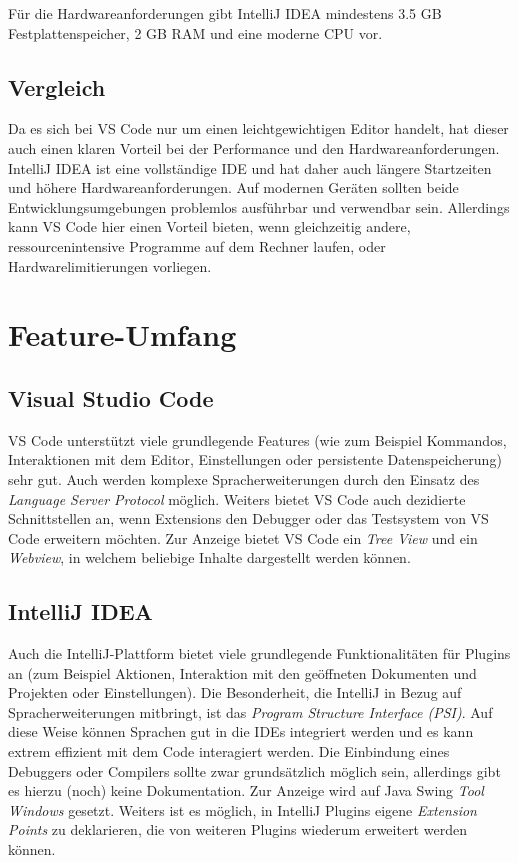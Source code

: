 Für die Hardwareanforderungen gibt IntelliJ IDEA
mindestens 3.5 GB Festplattenspeicher, 2 GB RAM und eine
moderne CPU vor.

\subsection{Vergleich}

Da es sich bei VS Code nur um einen leichtgewichtigen Editor handelt,
hat dieser auch einen klaren Vorteil bei der Performance 
und den Hardwareanforderungen.
IntelliJ IDEA ist eine vollständige IDE und hat daher auch längere
Startzeiten und höhere Hardwareanforderungen.
Auf modernen Geräten sollten beide Entwicklungsumgebungen
problemlos ausführbar und verwendbar sein. Allerdings kann VS Code hier
einen Vorteil bieten, wenn gleichzeitig andere, ressourcenintensive Programme
auf dem Rechner laufen, oder Hardwarelimitierungen vorliegen.


\section{Feature-Umfang}
\label{sec:Vergleich_FeatureUmfang}

\subsection{Visual Studio Code}

VS Code unterstützt viele grundlegende Features (wie zum Beispiel 
Kommandos, Interaktionen mit dem Editor, Einstellungen oder persistente
Datenspeicherung) sehr gut. Auch werden komplexe Spracherweiterungen
durch den Einsatz des \emph{Language Server Protocol} möglich.
Weiters bietet VS Code auch dezidierte Schnittstellen an, wenn Extensions
den Debugger oder das Testsystem von VS Code erweitern möchten.
Zur Anzeige bietet VS Code ein \emph{Tree View} und ein 
\emph{Webview}, in welchem beliebige Inhalte dargestellt werden können.

\subsection{IntelliJ IDEA}

Auch die IntelliJ-Plattform bietet viele grundlegende Funktionalitäten
für Plugins an (zum Beispiel Aktionen, Interaktion mit den geöffneten Dokumenten
und Projekten oder Einstellungen). Die Besonderheit, die IntelliJ
in Bezug auf Spracherweiterungen
mitbringt, ist das \emph{Program Structure Interface (PSI)}. 
Auf diese Weise können Sprachen gut in die IDEs integriert werden
und es kann extrem effizient mit dem Code interagiert werden.
Die Einbindung eines Debuggers oder Compilers sollte zwar grundsätzlich
möglich sein, allerdings gibt es hierzu (noch) keine Dokumentation.
Zur Anzeige wird auf Java Swing \emph{Tool Windows} gesetzt.
Weiters ist es möglich, in IntelliJ Plugins eigene 
\emph{Extension Points} zu deklarieren, die von weiteren Plugins
wiederum erweitert werden können.

